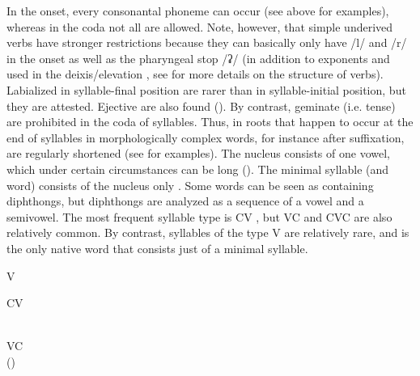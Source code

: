 In the onset, every consonantal phoneme can occur (see  above for examples), whereas in the coda not all  are allowed. Note, however, that simple underived verbs have stronger restrictions because they can basically only have /l/ and /r/ in the onset as well as the pharyngeal stop /ʡ/ (in addition to  exponents and  used in the deixis/elevation , see  for more details on the structure of verbs). Labialized  in syllable-final position are rarer than in syllable-initial position, but they are attested. Ejective  are also found (). By contrast, geminate (i.e. tense)  are prohibited in the coda of syllables. Thus,  in roots that happen to occur at the end of syllables in morphologically complex words, for instance after suffixation, are regularly shortened (see  for examples). The nucleus consists of one vowel, which under certain circumstances can be long (). The minimal syllable (and word) consists of the nucleus only . Some words can be seen as containing diphthongs, but diphthongs are analyzed as a sequence of a vowel and a semivowel. The most frequent syllable type is CV , but VC  and CVC  are also relatively common. By contrast, syllables of the type V are relatively rare, and   is the only native word that consists just of a minimal syllable.
%
\begin{exe}
\TabPositions{11em}
	\ex	V	\label{ex:syllable V phon} \\
		 	 \tab {} 	
\end{exe}	

\begin{exe}
\TabPositions{11em}
	\ex	CV	\label{ex:syllable CV phon} \\
		 	\tab {} 	\\
		  	\tab{} 		
		 	\tab {} 	
\end{exe}	

\begin{exe}
\TabPositions{11em}
	\ex	VC	\label{ex:syllable VC phon} \\
		 	() \tab {} 	
\end{exe}

